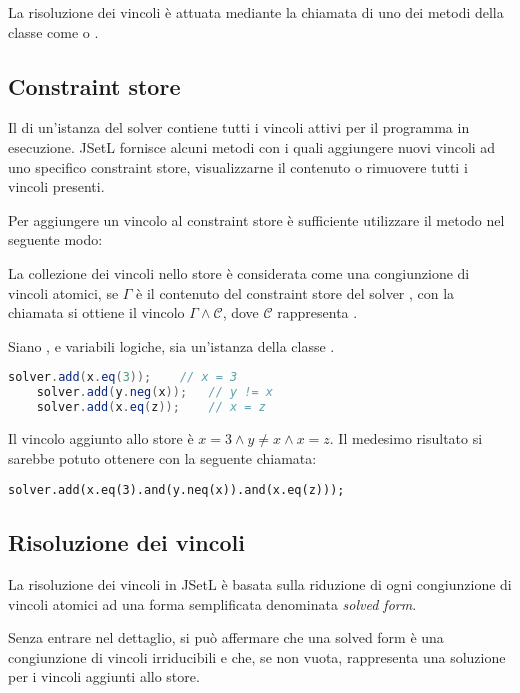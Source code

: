 La risoluzione dei vincoli è attuata mediante la chiamata di uno dei metodi
della classe  come  o .

\subsection{Constraint store}
Il  di un'istanza del solver contiene tutti i 
vincoli attivi per il programma in esecuzione. JSetL fornisce alcuni
metodi con i quali aggiungere nuovi vincoli ad uno specifico constraint store,
visualizzarne il contenuto o rimuovere tutti i vincoli presenti.

Per aggiungere un vincolo  al constraint store  è 
sufficiente utilizzare il metodo  nel seguente modo:
\begin{center}
\end{center}
La collezione dei vincoli nello store è considerata come una congiunzione di
vincoli atomici, se $\Gamma$ è il contenuto del constraint store del
solver , con la chiamata  si ottiene il vincolo
$\Gamma \wedge \mathcal{C}$, dove $\mathcal{C}$ rappresenta 
. 

\begin{ese}
Siano ,  e  variabili logiche, sia 
un'istanza della classe .
\begin{lstlisting}[language = Java, frame = single]
    solver.add(x.eq(3));    // x = 3
    solver.add(y.neg(x));   // y != x
    solver.add(x.eq(z));    // x = z
\end{lstlisting}
Il vincolo aggiunto allo store è $x = 3 \wedge y \neq x \wedge x = z$. Il
medesimo risultato si sarebbe potuto ottenere con la seguente chiamata:
\begin{center}
\lstinline$solver.add(x.eq(3).and(y.neq(x)).and(x.eq(z)));$
\end{center}
\end{ese}

\subsection{Risoluzione dei vincoli}
La risoluzione dei vincoli in JSetL è basata sulla riduzione di ogni 
congiunzione di vincoli atomici ad una forma semplificata denominata 
\emph{solved form}.

Senza entrare nel dettaglio, si può affermare che una solved form è una
congiunzione di vincoli irriducibili e che, se non vuota, rappresenta una 
soluzione per i vincoli aggiunti allo store.

